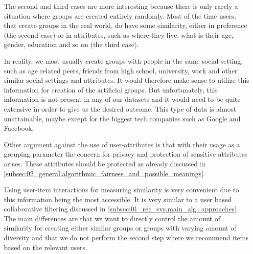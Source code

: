 The second and third cases are more interesting because there is only rarely a situation where groups are created entirely randomly. Most of the time users, that create groups in the real world, do have some similarity, either in preference (the second case) or in attributes, such as where they live, what is their age, gender, education and so on (the third case).

In reality, we most usually create groups with people in the same social setting, such as age related peers, friends from high school, university, work and other similar social settings and attributes. It would therefore make sense to utilize this information for creation of the artificial groups. But unfortunately, this information is not present in any of our datasets and it would need to be quite extensive in order to give us the desired outcome. This type of data is almost unattainable, maybe except for the biggest tech companies such as Google and Facebook.

Other argument against the use of user-attributes is that with their usage as a grouping parameter the concern for privacy and protection of sensitive attributes arises. These attributes should be protected as already discussed in \ref{subsec:02_general.algorithmic_fairness_and_possible_meanings}.

Using user-item interactions for measuring similarity is very convenient due to this information being the most accessible. It is very similar to a user based collaborative filtering discussed in \ref{subsec:01_rec_sys.main_alg_approaches}. The main differences are that we want to directly control the amount of similarity for creating either similar groups or groups with varying amount of diversity and that we do not perform the second step where we recommend items based on the relevant users.



